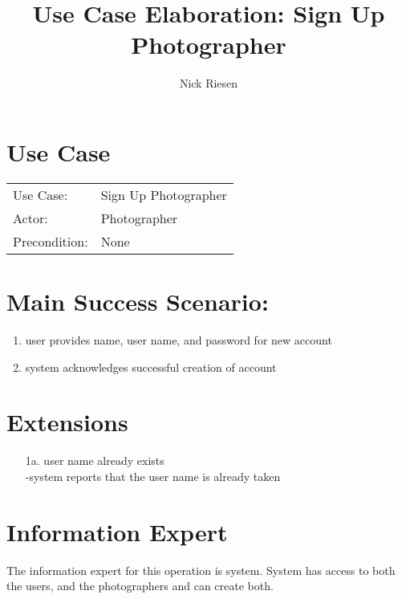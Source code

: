 \documentclass{article}
\title{Use Case Elaboration: Sign Up Photographer}
\author{ Nick Riesen }
\begin{document}
\maketitle


\section*{Use Case}
\begin{tabular}{l l}
Use Case:     & Sign Up Photographer \\
Actor:        & Photographer         \\
Precondition: & None                 \\
\end{tabular}


\section*{Main Success Scenario:}

\begin{enumerate}
    \item user provides name, user name, and password for new account
    \item system acknowledges successful creation of account

\end{enumerate}

\section*{Extensions}

\begin{itemize}
    \item [1a.]user name already exists \\
        -system reports that the user name is already taken
                            
\end{itemize}


\section*{Information Expert}
The information expert for this operation is system. System has access to both the users, and the photographers and can create both.
\end{document}

